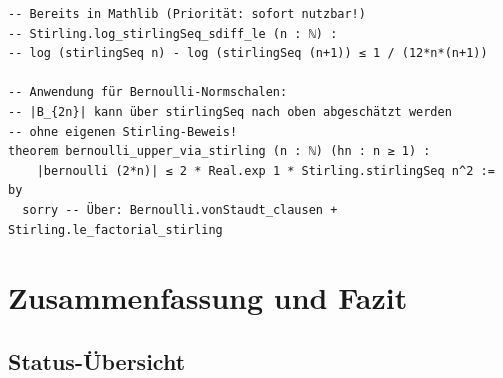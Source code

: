 \documentclass[12pt,a4paper]{article}
\begin{document}
\begin{tcolorbox}[roadmap, title={Priorität 8: Robbins-Schranke für Stirling-Anwendung}]
\begin{lstlisting}[language=Lean4]
-- Bereits in Mathlib (Priorität: sofort nutzbar!)
-- Stirling.log_stirlingSeq_sdiff_le (n : ℕ) :
-- log (stirlingSeq n) - log (stirlingSeq (n+1)) ≤ 1 / (12*n*(n+1))

-- Anwendung für Bernoulli-Normschalen:
-- |B_{2n}| kann über stirlingSeq nach oben abgeschätzt werden
-- ohne eigenen Stirling-Beweis!
theorem bernoulli_upper_via_stirling (n : ℕ) (hn : n ≥ 1) :
    |bernoulli (2*n)| ≤ 2 * Real.exp 1 * Stirling.stirlingSeq n^2 := by
  sorry -- Über: Bernoulli.vonStaudt_clausen + Stirling.le_factorial_stirling
\end{lstlisting}
\end{tcolorbox}

\section{Zusammenfassung und Fazit}
\label{sec:fazit}

\subsection{Status-Übersicht}
\end{document}
